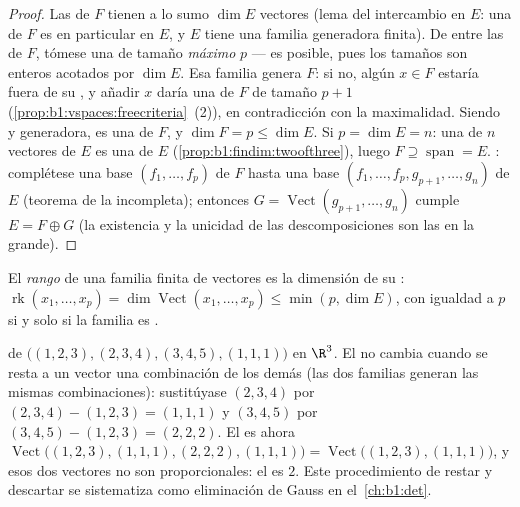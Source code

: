 \begin{proof}
Las  de $F$ tienen a lo sumo $\dim E$ vectores (lema
del intercambio en $E$: una  de $F$ es en particular
 en $E$, y $E$ tiene una familia generadora finita). De entre
las  de $F$, tómese una de tamaño \emph{máximo} $p$
--- es posible, pues los tamaños son enteros acotados por $\dim E$.
Esa familia genera $F$: si no, algún $x \in F$ estaría fuera de su
, y añadir $x$ daría una  de $F$ de
tamaño $p + 1$ (\cref{prop:b1:vspaces:freecriteria}~(2)), en
contradicción con la maximalidad. Siendo  y generadora, es una
 de $F$, y $\dim F = p \leq \dim E$. Si $p = \dim E = n$: una
 de $n$ vectores de $E$ es una  de $E$
(\cref{prop:b1:findim:twoofthree}), luego
$F \supseteq \operatorname{span} = E$. : complétese una
base $(f_1, \dots, f_p)$ de $F$ hasta una base
$(f_1, \dots, f_p, g_{p+1}, \dots, g_n)$ de $E$ (teorema de la 
incompleta); entonces $G = \operatorname{Vect}(g_{p+1}, \dots, g_n)$
cumple $E = F \oplus G$ (la existencia y la unicidad de las
descomposiciones son las  en la  grande).
\end{proof}

\begin{definition}\label{def:b1:findim:rank}
El \emph{rango} de una familia finita de
vectores es la dimensión de su :
$\operatorname{rk}(x_1, \dots, x_p) = \dim
\operatorname{Vect}(x_1, \dots, x_p) \leq \min(p, \dim E)$, con
igualdad a $p$ si y solo si la familia es .
\end{definition}

\begin{example}
\label{ex:b1:findim:rankcomputation}
 de $\bigl((1,2,3), (2,3,4), (3,4,5), (1,1,1)\bigr)$ en
$\R^3$. El  no cambia cuando se resta a un vector
una combinación de los demás (las dos familias generan las mismas
combinaciones): sustitúyase $(2,3,4)$ por $(2,3,4) - (1,2,3) =
(1,1,1)$ y $(3,4,5)$ por $(3,4,5) - (1,2,3) = (2,2,2)$. El
 es ahora
$\operatorname{Vect}\bigl((1,2,3), (1,1,1), (2,2,2),
(1,1,1)\bigr) = \operatorname{Vect}\bigl((1,2,3), (1,1,1)\bigr)$, y
esos dos vectores no son proporcionales: el  es $2$. Este
procedimiento de restar y descartar se sistematiza como eliminación
de Gauss en el~\cref{ch:b1:det}.
\end{example}

